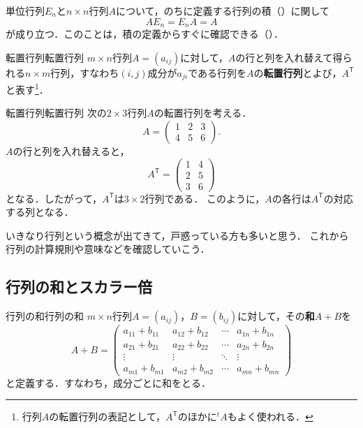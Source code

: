 単位行列$E_n$と$n \times n$行列$A$について，のちに定義する行列の積（）に関して
\[
  A E_n = E_n A = A
\]
が成り立つ．このことは，積の定義からすぐに確認できる（）．

\begin{definition}{転置行列}{転置行列}
  $m \times n$行列$A = (a_{ij})$に対して，$A$の行と列を入れ替えて得られる$n \times m$行列，すなわち$(i, j)$成分が$a_{ji}$である行列を$A$の\textbf{転置行列}とよび，$A^\mathsf{T}$と表す\footnote{行列$A$の転置行列の表記として，$A^\mathsf{T}$のほかに${}^t A$もよく使われる．}．
\end{definition}

\begin{example}{転置行列}{転置行列}
  次の$2 \times 3$行列$A$の転置行列を考える．
  \[
    A =
    \begin{pmatrix}
      1 & 2 & 3 \\
      4 & 5 & 6
    \end{pmatrix}.
  \]
  $A$の行と列を入れ替えると，
  \[
    A^\mathsf{T}
    =
    \begin{pmatrix}
      1 & 4 \\
      2 & 5 \\
      3 & 6
    \end{pmatrix}
  \]
  となる．したがって，$A^\mathsf{T}$は$3 \times 2$行列である．
  このように，$A$の各行は$A^\mathsf{T}$の対応する列となる．
\end{example}

いきなり行列という概念が出てきて，戸惑っている方も多いと思う．
これから行列の計算規則や意味などを確認していこう．

\subsection{行列の和とスカラー倍}

\begin{definition}{行列の和}{行列の和}
  $m \times n$行列$A = (a_{ij})$，$B = (b_{ij})$に対して，その\textbf{和}$A + B$を
  \[
    A + B =
    \begin{pmatrix}
      a_{11} + b_{11} & a_{12} + b_{12} & \cdots & a_{1n} + b_{1n} \\
      a_{21} + b_{21} & a_{22} + b_{22} & \cdots & a_{2n} + b_{2n} \\
      \vdots & \vdots & \ddots & \vdots \\
      a_{m1} + b_{m1} & a_{m2} + b_{m2} & \cdots & a_{mn} + b_{mn}
    \end{pmatrix}
  \]
  と定義する．すなわち，成分ごとに和をとる．
\end{definition}

